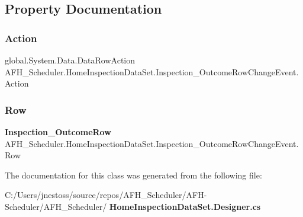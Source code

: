 \subsection{Property Documentation}
\mbox{\label{class_a_f_h___scheduler_1_1_home_inspection_data_set_1_1_inspection___outcome_row_change_event_abe492d74a74d2110a0579bd8c7baf984}} 
\subsubsection{Action}
{\footnotesize\ttfamily global.\+System.\+Data.\+Data\+Row\+Action A\+F\+H\+\_\+\+Scheduler.\+Home\+Inspection\+Data\+Set.\+Inspection\+\_\+\+Outcome\+Row\+Change\+Event.\+Action\hspace{0.3cm}{\ttfamily [get]}}

\mbox{\label{class_a_f_h___scheduler_1_1_home_inspection_data_set_1_1_inspection___outcome_row_change_event_aaa1300da0787e8f8936f5e7b18da70f1}} 
\subsubsection{Row}
{\footnotesize\ttfamily \textbf{ Inspection\+\_\+\+Outcome\+Row} A\+F\+H\+\_\+\+Scheduler.\+Home\+Inspection\+Data\+Set.\+Inspection\+\_\+\+Outcome\+Row\+Change\+Event.\+Row\hspace{0.3cm}{\ttfamily [get]}}



The documentation for this class was generated from the following file\+:\begin{DoxyCompactItemize}
\item 
C\+:/\+Users/jnestoss/source/repos/\+A\+F\+H\+\_\+\+Scheduler/\+A\+F\+H-\/\+Scheduler/\+A\+F\+H\+\_\+\+Scheduler/\textbf{ Home\+Inspection\+Data\+Set.\+Designer.\+cs}\end{DoxyCompactItemize}
